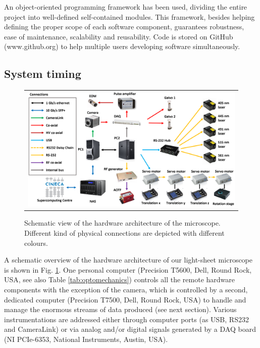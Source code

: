 \documentclass[12pt]{spieman}  %
\begin{document}
An object-oriented programming framework \cite{castagna1997object} has been used, dividing the entire project into well-defined self-contained modules. This framework, besides helping defining the proper scope of each software component, guarantees robustness, ease of maintenance, scalability and reusability. Code is stored on GitHub (www.github.org) to help multiple users developing software simultaneously. %

\subsection{System timing}
\label{sec:timing}

	\begin{figure}
   \begin{center}
   \begin{tabular}{c}
   \includegraphics[width=\textwidth]{connectivity.eps}
   \end{tabular}
   \end{center}
   \caption{\label{fig:connectivity} Schematic view of the hardware architecture of the microscope. Different kind of physical connections are depicted with different colours.} 
   \end{figure}

A schematic overview of the hardware architecture of our light-sheet microscope is shown in Fig. \ref{fig:connectivity}. One personal computer (Precision T5600, Dell, Round Rock, USA, see also Table \ref{tab:optomechanics}) controls all the remote hardware components with the exception of the camera, which is controlled by a second, dedicated computer (Precision T7500, Dell, Round Rock, USA) to handle and manage the enormous streams of data produced (see next section). Various instrumentations are addressed either through computer ports (as USB, RS232 and CameraLink) or via analog and/or digital signals generated by a DAQ board (NI PCIe-6353, National Instruments, Austin, USA).
\end{document}
